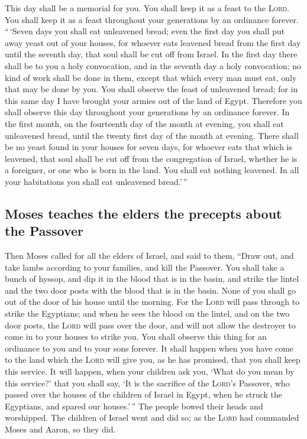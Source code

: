  This day shall be a memorial for you. You shall keep it
as a feast to the \textsc{Lord}. You shall keep it as a feast throughout
your generations by an ordinance forever.  ``\,`Seven
days you shall eat unleavened bread; even the first day you shall put
away yeast out of your houses, for whoever eats leavened bread from the
first day until the seventh day, that soul shall be cut off from Israel.
 In the first day there shall be to you a holy
convocation, and in the seventh day a holy convocation; no kind of work
shall be done in them, except that which every man must eat, only that
may be done by you.  You shall observe the feast of
unleavened bread; for in this same day I have brought your armies out of
the land of Egypt. Therefore you shall observe this day throughout your
generations by an ordinance forever.  In the first month,
on the fourteenth day of the month at evening, you shall eat unleavened
bread, until the twenty first day of the month at evening.
 There shall be no yeast found in your houses for seven
days, for whoever eats that which is leavened, that soul shall be cut
off from the congregation of Israel, whether he is a foreigner, or one
who is born in the land.  You shall eat nothing leavened.
In all your habitations you shall eat unleavened bread.'\,''

\hypertarget{moses-teaches-the-elders-the-precepts-about-the-passover}{%
\subsection{Moses teaches the elders the precepts about the
Passover}\label{moses-teaches-the-elders-the-precepts-about-the-passover}}

 Then Moses called for all the elders of Israel, and said
to them, ``Draw out, and take lambs according to your families, and kill
the Passover.  You shall take a bunch of hyssop, and dip
it in the blood that is in the basin, and strike the lintel and the two
door posts with the blood that is in the basin. None of you shall go out
of the door of his house until the morning.  For the
\textsc{Lord} will pass through to strike the Egyptians; and when he
sees the blood on the lintel, and on the two door posts, the
\textsc{Lord} will pass over the door, and will not allow the destroyer
to come in to your houses to strike you.  You shall
observe this thing for an ordinance to you and to your sons forever.
 It shall happen when you have come to the land which the
\textsc{Lord} will give you, as he has promised, that you shall keep
this service.  It will happen, when your children ask
you, `What do you mean by this service?'  that you shall
say, `It is the sacrifice of the \textsc{Lord}'s Passover, who passed
over the houses of the children of Israel in Egypt, when he struck the
Egyptians, and spared our houses.'\,'' The people bowed their heads and
worshipped.  The children of Israel went and did so; as
the \textsc{Lord} had commanded Moses and Aaron, so they did.

